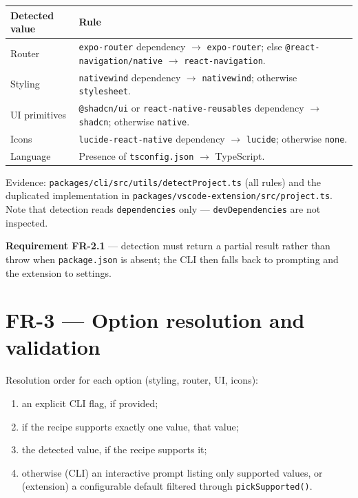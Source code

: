 \begin{longtable}{@{}L{5.2cm}L{8.8cm}@{}}
\toprule
\textbf{Detected value} & \textbf{Rule} \\
\midrule
\endhead
Router & \texttt{expo-router} dependency $\rightarrow$ \texttt{expo-router};
else \texttt{@react-navigation/native} $\rightarrow$ \texttt{react-navigation}. \\
Styling & \texttt{nativewind} dependency $\rightarrow$ \texttt{nativewind};
otherwise \texttt{stylesheet}. \\
UI primitives & \texttt{@shadcn/ui} or \texttt{react-native-reusables} dependency
$\rightarrow$ \texttt{shadcn}; otherwise \texttt{native}. \\
Icons & \texttt{lucide-react-native} dependency $\rightarrow$ \texttt{lucide};
otherwise \texttt{none}. \\
Language & Presence of \texttt{tsconfig.json} $\rightarrow$ TypeScript. \\
\bottomrule
\end{longtable}

Evidence: \texttt{packages/cli/src/utils/detectProject.ts} (all rules) and the
duplicated implementation in \texttt{packages/vscode-extension/src/project.ts}.
Note that detection reads \texttt{dependencies} only --- \texttt{devDependencies}
are not inspected.

\textbf{Requirement FR-2.1} --- detection must return a partial result rather than
throw when \texttt{package.json} is absent; the CLI then falls back to prompting
and the extension to settings.

\section{FR-3 --- Option resolution and validation}

Resolution order for each option (styling, router, UI, icons):

\begin{enumerate}
  \item an explicit CLI flag, if provided;
  \item if the recipe supports exactly one value, that value;
  \item the detected value, if the recipe supports it;
  \item otherwise (CLI) an interactive prompt listing only supported values, or
        (extension) a configurable default filtered through
        \texttt{pickSupported()}.
\end{enumerate}

